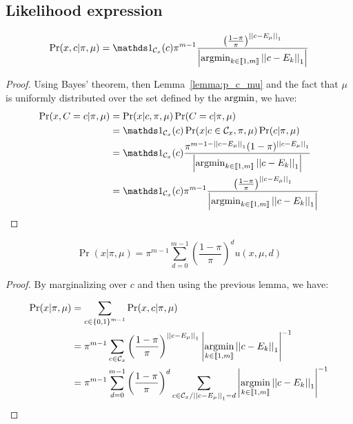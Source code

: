 \subsection{Likelihood expression}

\begin{lemma}
    \label{lemma:p_x_c_knowing_pi_mu_appendix}
    \[\Pr(x, c | \pi, \mu) = \indic{}_{\mathcal{C}_x}(c) \pi^{m-1}  \frac{\left(\frac{1 - \pi}{\pi}\right)^{\norm{c - E_{\mu}}_1}}{\card{\argmin_{k \in \bbrack{1, m}} \norm{c - E_k}_1}} \]
\end{lemma}
\begin{proof}
    Using Bayes' theorem, then Lemma~\ref{lemma:p_c_mu} and the fact that $\mu$ is uniformly distributed over the set defined by the $\operatorname*{argmin}$, we have:
    \begin{align}
        \Pr(x, C=c | \pi, \mu)
        &= \Pr(x | c, \pi, \mu) \Pr(C = c | \pi, \mu)\\
        &=  \indic{}_{\mathcal{C}_x}(c) \Pr(x | c \in \mathcal{C}_x, \pi, \mu) \Pr(c | \pi, \mu)\\
        &= \indic{}_{\mathcal{C}_x}(c) \frac{\pi^{m - 1 - \norm{c - E_{\mu}}_1} (1 - \pi)^{\norm{c - E_{\mu}}_1}}{\card{\argmin_{k \in \bbrack{1, m}} \norm{c - E_k}_1}}\\
        &= \indic{}_{\mathcal{C}_x}(c) \pi^{m-1}  \frac{\left(\frac{1 - \pi}{\pi}\right)^{\norm{c - E_{\mu}}_1}}{\card{\argmin_{k \in \bbrack{1, m}} \norm{c - E_k}_1}}
    \end{align}
\end{proof}


\begin{thm}
    \label{thm:p_x_knowing_pi_mu}
    \[\Pr(x | \pi, \mu) = \pi^{m-1} \sum_{d = 0}^{m-1} \left(\frac{1 - \pi}{\pi}\right)^d u(x, \mu, d)\]
\end{thm}
\begin{proof}
    By marginalizing over $c$ and then using the previous lemma, we have:

\begin{align}
    \Pr(x | \pi, \mu)
    &= \sum_{c \in \left\{ 0, 1 \right\}^{m-1}} \Pr(x, c | \pi, \mu)\\
    &= \pi^{m-1} \sum_{c \in \mathcal{C}_x} \left(\frac{1 - \pi}{\pi}\right)^{\left|\left|c - E_{\mu}\right|\right|_1} \left|\operatorname*{argmin}_{k \in \left\llbracket1, m\right\rrbracket} \left|\left|c - E_k\right|\right|_1\right|^{-1}\\
    &= \pi^{m-1} \sum_{d = 0}^{m-1} \left(\frac{1 - \pi}{\pi}\right)^d \sum_{c \in \mathcal{C}_x / \left|\left|c - E_{\mu}\right|\right|_1 = d}  \left|\operatorname*{argmin}_{k \in \left\llbracket1, m\right\rrbracket} \left|\left|c - E_k\right|\right|_1\right|^{-1}
\end{align}
\end{proof}


